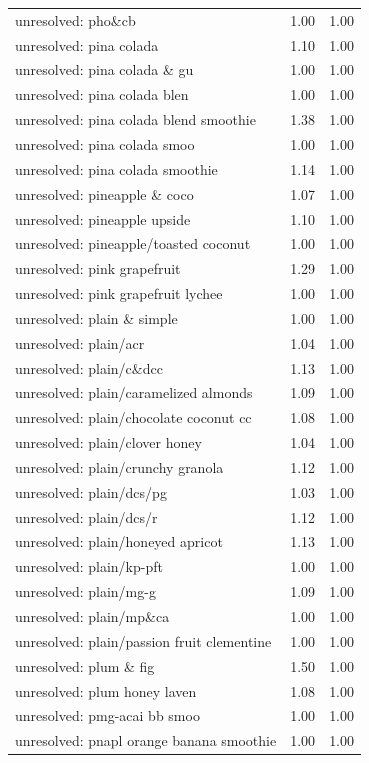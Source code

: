 \begin{table}
\begin{tabular}{lrr}
unresolved: pho\&cb & 1.00 & 1.00 \\
unresolved: pina colada & 1.10 & 1.00 \\
unresolved: pina colada \& gu & 1.00 & 1.00 \\
unresolved: pina colada blen & 1.00 & 1.00 \\
unresolved: pina colada blend smoothie & 1.38 & 1.00 \\
unresolved: pina colada smoo & 1.00 & 1.00 \\
unresolved: pina colada smoothie & 1.14 & 1.00 \\
unresolved: pineapple \& coco & 1.07 & 1.00 \\
unresolved: pineapple upside & 1.10 & 1.00 \\
unresolved: pineapple/toasted coconut & 1.00 & 1.00 \\
unresolved: pink grapefruit & 1.29 & 1.00 \\
unresolved: pink grapefruit lychee & 1.00 & 1.00 \\
unresolved: plain \& simple & 1.00 & 1.00 \\
unresolved: plain/acr & 1.04 & 1.00 \\
unresolved: plain/c\&dcc & 1.13 & 1.00 \\
unresolved: plain/caramelized almonds & 1.09 & 1.00 \\
unresolved: plain/chocolate coconut cc & 1.08 & 1.00 \\
unresolved: plain/clover honey & 1.04 & 1.00 \\
unresolved: plain/crunchy granola & 1.12 & 1.00 \\
unresolved: plain/dcs/pg & 1.03 & 1.00 \\
unresolved: plain/dcs/r & 1.12 & 1.00 \\
unresolved: plain/honeyed apricot & 1.13 & 1.00 \\
unresolved: plain/kp-pft & 1.00 & 1.00 \\
unresolved: plain/mg-g & 1.09 & 1.00 \\
unresolved: plain/mp\&ca & 1.00 & 1.00 \\
unresolved: plain/passion fruit clementine & 1.00 & 1.00 \\
unresolved: plum \& fig & 1.50 & 1.00 \\
unresolved: plum honey laven & 1.08 & 1.00 \\
unresolved: pmg-acai bb smoo & 1.00 & 1.00 \\
unresolved: pnapl orange banana smoothie & 1.00 & 1.00 \\

\end{tabular}
\end{table}
